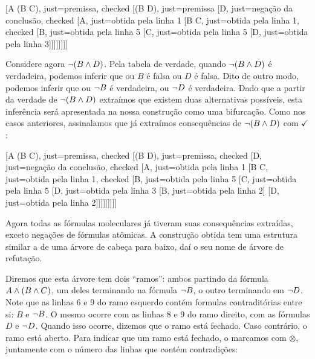 \begin{center}
\begin{tableau}
	{
	}
	[A \eand (B \eand C), just={premissa}, checked
	[\enot(B \eand D), just={premissa}
	[\enot \enot D, just={negação da conclusão}, checked
	[A, just={obtida pela linha 1}
	[B \eand C, just={obtida pela linha 1}, checked
	[B, just={obtida pela linha 5}
	[C, just={obtida pela linha 5}
	[D, just={obtida pela linha 3}]]]]]]]]
\end{tableau}
\end{center}



Considere agora $\neg(B \wedge D)$.  
Pela tabela de verdade, quando $\neg(B \wedge D)$ é verdadeira, podemos inferir que ou $B$ é falsa ou $D$ é falsa.
Dito de outro modo, podemos inferir que ou $\neg B$ é verdadeira, ou $\neg D$ é verdadeira.
Dado que a partir da verdade de $\neg(B \wedge D)$ extraímos que existem duas alternativas possíveis, esta inferência será apresentada na nossa construção como uma bifurcação. Como nos casos anteriores, assinalamos que já extraímos consequências de $\neg(B \wedge D)$  com $\checkmark$:
\begin{center}
\begin{tableau}
	{
	}
	[A \eand (B \eand C), just={premissa}, checked
	[\enot(B \eand D), just={premissa}, checked
	[\enot \enot D, just={negação da conclusão}, checked
	[A, just={obtida pela linha 1}
	[B \eand C, just={obtida pela linha 1}, checked
	[B, just={obtida pela linha 5}
	[C, just={obtida pela linha 5}
	[D, just={obtida pela linha 3}
		[\enot B, just={obtida pela linha 2}]
		[\enot D, just={obtida pela linha 2}]]]]]]]]]
\end{tableau}
\end{center}


Agora todas as fórmulas moleculares já tiveram suas consequências extraídas, exceto negações de fórmulas atômicas. 
A construção obtida tem uma estrutura similar a de uma árvore de cabeça para baixo, daí o seu nome de árvore de refutação.

Diremos que esta árvore tem dois ``ramos'': ambos partindo da fórmula $A \wedge (B \wedge C)$, um deles terminando na fórmula $\neg B$, o outro terminando em $\neg D$.
Note que as linhas 6 e 9 do ramo esquerdo contém formulas contraditórias entre si: $B$ e $\neg B$.
O mesmo ocorre com as linhas 8 e 9 do ramo direito, com as fórmulas $D$ e $\neg D$.
Quando isso ocorre, dizemos que o ramo está fechado.
Caso contrário, o ramo está aberto.
Para indicar que um ramo está fechado, o marcamos com $\otimes$, juntamente com o número das linhas que contém contradições:

